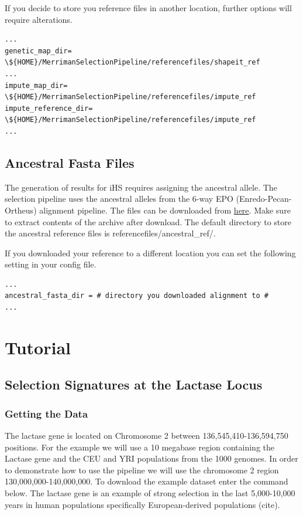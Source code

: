 \documentclass[a4paper,10pt]{article}
\begin{document}
If you decide to store you reference files in another location, further options will require alterations.\\ 
\begin{verbatim}
...
genetic_map_dir= \${HOME}/MerrimanSelectionPipeline/referencefiles/shapeit_ref
...
impute_map_dir= \${HOME}/MerrimanSelectionPipeline/referencefiles/impute_ref
impute_reference_dir= \${HOME}/MerrimanSelectionPipeline/referencefiles/impute_ref
...
\end{verbatim}

\subsection{Ancestral Fasta Files}
The generation of results for iHS requires assigning the ancestral allele. The selection pipeline uses the ancestral alleles from the 6-way EPO (Enredo-Pecan-Ortheus) alignment pipeline. The files can be downloaded from \href{ftp://ftp.1000genomes.ebi.ac.uk/vol1/ftp/phase1/analysis_results/supporting/ancestral_alignments/human_ancestor_GRCh37_e59.tar.bz2}{here}. Make sure to extract contents of the archive after download. The default directory to store the ancestral reference files is referencefiles/ancestral\_ref/.

If you downloaded your reference to a different location you can set the following setting in your config file.\\
\begin{verbatim}
...
ancestral_fasta_dir = # directory you downloaded alignment to #
...
\end{verbatim}

\section{Tutorial}
\subsection{Selection Signatures at the Lactase Locus}
\subsubsection{Getting the Data}
The lactase gene is located on Chromosome 2 between 136,545,410-136,594,750 positions. For the example we will use a 10 megabase region containing the Lactase gene and the CEU and YRI populations from the 1000 genomes. In order to demonstrate how to use the pipeline we will use the chromosome 2 region 130,000,000-140,000,000. To download the example dataset enter the command below. The lactase gene is an example of strong selection in the last 5,000-10,000 years in human populations specifically European-derived populations (cite).  \\
\end{document}
